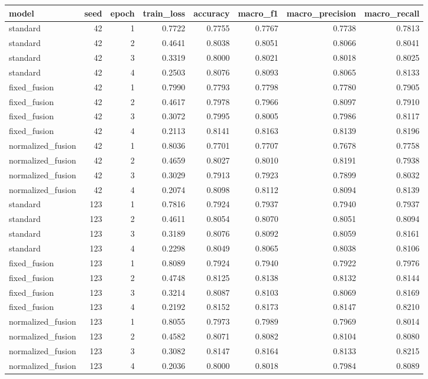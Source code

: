 \begin{tabular}{lrrrrrrr}
\toprule
model & seed & epoch & train_loss & accuracy & macro_f1 & macro_precision & macro_recall \\
\midrule
standard & 42 & 1 & 0.7722 & 0.7755 & 0.7767 & 0.7738 & 0.7813 \\
standard & 42 & 2 & 0.4641 & 0.8038 & 0.8051 & 0.8066 & 0.8041 \\
standard & 42 & 3 & 0.3319 & 0.8000 & 0.8021 & 0.8018 & 0.8025 \\
standard & 42 & 4 & 0.2503 & 0.8076 & 0.8093 & 0.8065 & 0.8133 \\
fixed_fusion & 42 & 1 & 0.7990 & 0.7793 & 0.7798 & 0.7780 & 0.7905 \\
fixed_fusion & 42 & 2 & 0.4617 & 0.7978 & 0.7966 & 0.8097 & 0.7910 \\
fixed_fusion & 42 & 3 & 0.3072 & 0.7995 & 0.8005 & 0.7986 & 0.8117 \\
fixed_fusion & 42 & 4 & 0.2113 & 0.8141 & 0.8163 & 0.8139 & 0.8196 \\
normalized_fusion & 42 & 1 & 0.8036 & 0.7701 & 0.7707 & 0.7678 & 0.7758 \\
normalized_fusion & 42 & 2 & 0.4659 & 0.8027 & 0.8010 & 0.8191 & 0.7938 \\
normalized_fusion & 42 & 3 & 0.3029 & 0.7913 & 0.7923 & 0.7899 & 0.8032 \\
normalized_fusion & 42 & 4 & 0.2074 & 0.8098 & 0.8112 & 0.8094 & 0.8139 \\
standard & 123 & 1 & 0.7816 & 0.7924 & 0.7937 & 0.7940 & 0.7937 \\
standard & 123 & 2 & 0.4611 & 0.8054 & 0.8070 & 0.8051 & 0.8094 \\
standard & 123 & 3 & 0.3189 & 0.8076 & 0.8092 & 0.8059 & 0.8161 \\
standard & 123 & 4 & 0.2298 & 0.8049 & 0.8065 & 0.8038 & 0.8106 \\
fixed_fusion & 123 & 1 & 0.8089 & 0.7924 & 0.7940 & 0.7922 & 0.7976 \\
fixed_fusion & 123 & 2 & 0.4748 & 0.8125 & 0.8138 & 0.8132 & 0.8144 \\
fixed_fusion & 123 & 3 & 0.3214 & 0.8087 & 0.8103 & 0.8069 & 0.8169 \\
fixed_fusion & 123 & 4 & 0.2192 & 0.8152 & 0.8173 & 0.8147 & 0.8210 \\
normalized_fusion & 123 & 1 & 0.8055 & 0.7973 & 0.7989 & 0.7969 & 0.8014 \\
normalized_fusion & 123 & 2 & 0.4582 & 0.8071 & 0.8082 & 0.8104 & 0.8080 \\
normalized_fusion & 123 & 3 & 0.3082 & 0.8147 & 0.8164 & 0.8133 & 0.8215 \\
normalized_fusion & 123 & 4 & 0.2036 & 0.8000 & 0.8018 & 0.7984 & 0.8089 \\
\bottomrule
\end{tabular}
